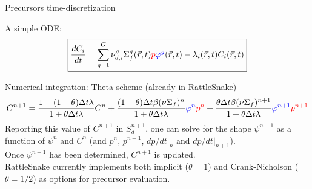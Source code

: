 \documentclass[8pt]{beamer}
\newcommand{\be}{\begin{equation}}
\newcommand{\ee}{\end{equation}}
\newcommand{\tcr}[1]{\textcolor{red}{#1}}
\newcommand{\tcb}[1]{\textcolor{blue}{#1}}
\begin{document}
\begin{frame}{Precursors time-discretization}

A simple ODE:
\begin{equation*}
\boxed{
\frac{dC_i}{dt} = \sum_{g=1}^G \nu_{d,i}^{g} \Sigma_f^g(\vec{r},t) \tcr{p} \tcb{\varphi^{g}}(\vec{r},t) - \lambda_i(\vec{r},t) C_i(\vec{r},t) 
}
\end{equation*}
\begin{block}{Numerical integration: Theta-scheme (already in RattleSnake)}
\be
C^{n+1} = \frac{1-(1-\theta)\Delta t\lambda}{1+\theta\Delta t\lambda}C^n 
+ \frac{(1-\theta)\Delta t \beta (\nu\Sigma_f)^n}    {1+\theta\Delta t\lambda}\tcb{\varphi^n}     \tcr{p^n }
+ \frac{\theta\Delta t     \beta (\nu\Sigma_f)^{n+1}}{1+\theta\Delta t\lambda}\tcb{\varphi^{n+1}} \tcr{p^{n+1}}
\ee
Reporting this value of $C^{n+1}$ in $S_d^{n+1}$, one can solve for the shape $\psi^{n+1}$ as a function of $\psi^n$ and $C^n$
(and $p^n$, $p^{n+1}$, $dp/dt|_n$ and  $dp/dt|_{n+1}$).\\

\bigskip
Once $\psi^{n+1}$ has been determined, $C^{n+1}$ is updated. \\

\medskip
RattleSnake currently implements both implicit ($\theta=1$) and Crank-Nicholson ($\theta=1/2$) as options for precursor evaluation.

\end{block}

\end{frame}
\end{document}
